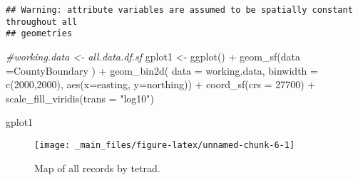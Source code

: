 \documentclass[
]{article}
\newenvironment{Shaded}{\begin{snugshade}}{\end{snugshade}}
\newcommand{\AttributeTok}[1]{\textcolor[rgb]{0.77,0.63,0.00}{#1}}
\newcommand{\CommentTok}[1]{\textcolor[rgb]{0.56,0.35,0.01}{\textit{#1}}}
\newcommand{\DecValTok}[1]{\textcolor[rgb]{0.00,0.00,0.81}{#1}}
\newcommand{\FunctionTok}[1]{\textcolor[rgb]{0.00,0.00,0.00}{#1}}
\newcommand{\NormalTok}[1]{#1}
\newcommand{\OtherTok}[1]{\textcolor[rgb]{0.56,0.35,0.01}{#1}}
\newcommand{\SpecialCharTok}[1]{\textcolor[rgb]{0.00,0.00,0.00}{#1}}
\newcommand{\StringTok}[1]{\textcolor[rgb]{0.31,0.60,0.02}{#1}}
\begin{document}
\begin{verbatim}
## Warning: attribute variables are assumed to be spatially constant throughout all
## geometries
\end{verbatim}

\begin{Shaded}
\begin{Highlighting}[]
\CommentTok{\#working.data \textless{}{-} all.data.df.sf}
\NormalTok{gplot1 }\OtherTok{\textless{}{-}} \FunctionTok{ggplot}\NormalTok{()  }\SpecialCharTok{+} 
 \FunctionTok{geom\_sf}\NormalTok{(}\AttributeTok{data =}\NormalTok{CountyBoundary ) }\SpecialCharTok{+}
  \FunctionTok{geom\_bin2d}\NormalTok{( }\AttributeTok{data =}\NormalTok{ working.data, }
              \AttributeTok{binwidth =} \FunctionTok{c}\NormalTok{(}\DecValTok{2000}\NormalTok{,}\DecValTok{2000}\NormalTok{), }
              \FunctionTok{aes}\NormalTok{(}\AttributeTok{x=}\NormalTok{easting, }\AttributeTok{y=}\NormalTok{northing)) }\SpecialCharTok{+} 
              \FunctionTok{coord\_sf}\NormalTok{(}\AttributeTok{crs =} \DecValTok{27700}\NormalTok{) }\SpecialCharTok{+}  
              \FunctionTok{scale\_fill\_viridis}\NormalTok{(}\AttributeTok{trans =} \StringTok{"log10"}\NormalTok{)}

\NormalTok{gplot1}
\end{Highlighting}
\end{Shaded}

\begin{figure}

{\centering \texttt{[image: \_main\_files/figure-latex/unnamed-chunk-6-1]} 

}

\caption{Map of all records by tetrad.}\label{fig:unnamed-chunk-6}
\end{figure}
\end{document}

